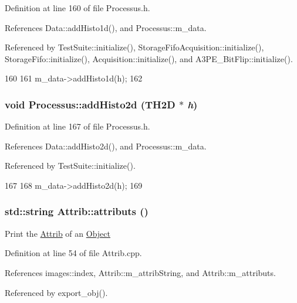 Definition at line 160 of file Processus.h.

References Data::addHisto1d(), and Processus::m\_\-data.

Referenced by TestSuite::initialize(), StorageFifoAcquisition::initialize(), StorageFifo::initialize(), Acquisition::initialize(), and A3PE\_\-BitFlip::initialize().


\begin{DoxyCode}
160                            {
161     m_data->addHisto1d(h);
162   }
\end{DoxyCode}
\hypertarget{classProcessus_ac1ed1aed5edaeabdf18aa56775440471}{
\subsubsection[{addHisto2d}]{\setlength{\rightskip}{0pt plus 5cm}void Processus::addHisto2d (TH2D $\ast$ {\em h})}}
\label{classProcessus_ac1ed1aed5edaeabdf18aa56775440471}


Definition at line 167 of file Processus.h.

References Data::addHisto2d(), and Processus::m\_\-data.

Referenced by TestSuite::initialize().


\begin{DoxyCode}
167                            {
168     m_data->addHisto2d(h);
169   }
\end{DoxyCode}
\hypertarget{classAttrib_aee7bbf16b144887f196e1341b24f8a26}{
\subsubsection[{attributs}]{\setlength{\rightskip}{0pt plus 5cm}std::string Attrib::attributs ()}}
\label{classAttrib_aee7bbf16b144887f196e1341b24f8a26}
Print the \hyperlink{classAttrib}{Attrib} of an \hyperlink{classObject}{Object} 

Definition at line 54 of file Attrib.cpp.

References images::index, Attrib::m\_\-attribString, and Attrib::m\_\-attributs.

Referenced by export\_\-obj().


